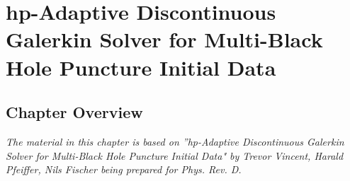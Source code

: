 \chapter{hp-Adaptive Discontinuous Galerkin Solver for Multi-Black Hole Puncture Initial Data}

\section{Chapter Overview}

\textit{The material in this chapter is based on ”hp-Adaptive Discontinuous Galerkin Solver for Multi-Black Hole Puncture Initial Data" by Trevor Vincent, Harald Pfeiffer, Nils Fischer being prepared for Phys. Rev. D.}
